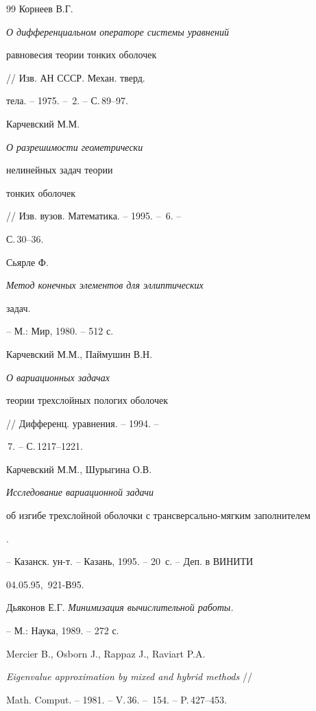 \begin{thebibliography}{99}
 Корнеев В.Г. {\em О дифференциальном операторе системы уравнений 


равновесия теории тонких оболочек} // Изв. АН СССР. Механ. тверд.


тела. -- 1975. -- \No\,2. -- С.\,89--97.





 Карчевский М.М. {\em О разрешимости геометрически


нелинейных задач теории


тонких оболочек} // Изв. вузов. Математика. -- 1995. -- \No\,6. -- 


С.\,30--36.





 Сьярле Ф. {\em Метод конечных элементов для эллиптических


задач.} -- М.: Мир, 1980. -- 512 с.





 Карчевский М.М., Паймушин В.Н. {\em О вариационных задачах


теории трехслойных пологих оболочек} // Дифференц. уравнения. -- 1994. --


\No\,7. -- С.\,1217--1221.





 Карчевский М.М., Шурыгина О.В. {\em Исследование вариационной задачи 


об изгибе трехслойной оболочки с трансверсально-мягким заполнителем}.


-- Казанск. ун-т. -- Казань, 1995. -- 20~с. -- Деп. в ВИНИТИ 


04.05.95, \No\,921-В95.





 Дьяконов Е.Г. {\em Минимизация вычислительной работы.}


-- М.: Наука, 1989. -- 272 с.





 Mercier B., Osborn J., Rappaz J., Raviart P.A.


{\em Eigenvalue approximation by mixed and hybrid methods} //


Math. Comput. -- 1981. -- V.\,36. -- \No\,154. -- P.\,427--453.





\end{thebibliography}


\vskip 1cm















